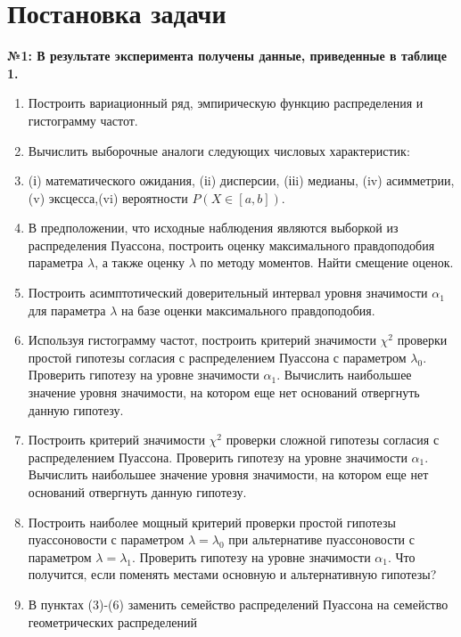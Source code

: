 \documentclass[areasetadvanced]{scrartcl}
\begin{document}
\section{Постановка задачи}

\textbf{№1:
В результате эксперимента получены данные, приведенные в таблице 1.}
\begin{enumerate}
    \item Построить вариационный ряд, эмпирическую функцию распределения и гистограмму частот.

    \item  Вычислить выборочные аналоги следующих числовых характеристик:
    \item (і) математического ожидания, (іi) дисперсии, (ііi) медианы, (iv) асимметрии, (v) эксцесса,(vi) вероятности $P(X \in [a, b])$.

    \item В предположении, что исходные наблюдения являются выборкой из распределения Пуассона, построить оценку максимального правдоподобия параметра $\lambda$, а также оценку $\lambda$ по методу моментов. Найти смещение оценок.

    \item Построить асимптотический доверительный интервал уровня значимости $\alpha_1$ для параметра $\lambda$ на базе оценки максимального правдоподобия.
    \item Используя гистограмму частот, построить критерий значимости $\chi^2$ проверки простой гипотезы согласия с распределением Пуассона с параметром $\lambda_0$. Проверить гипотезу на уровне значимости $\alpha_1$. Вычислить наибольшее значение уровня значимости, на котором еще нет оснований отвергнуть данную гипотезу.

    \item Построить критерий значимости $\chi^2$ проверки сложной гипотезы согласия с распределением Пуассона. Проверить гипотезу на уровне значимости $\alpha_1$. Вычислить наибольшее значение уровня значимости, на котором еще нет оснований отвергнуть данную гипотезу.

    \item Построить наиболее мощный критерий проверки простой гипотезы пуассоновости с параметром $\lambda = \lambda_0$ при альтернативе пуассоновости с параметром $\lambda = \lambda_1$. Проверить гипотезу на уровне значимости $\alpha_1$. Что получится, если поменять местами основную и альтернативную гипотезы?

    \item В пунктах (3)-(6) заменить семейство распределений Пуассона на семейство геометрических распределений
\end{enumerate}
\end{document}
